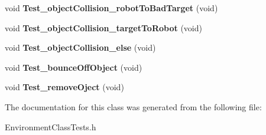 \begin{DoxyCompactItemize}
\item 
\hypertarget{classEnvironmentClassTests_a986fb21b334a78a100fe98aeaa6eaeb4}{void {\bfseries Test\-\_\-object\-Collision\-\_\-robot\-To\-Bad\-Target} (void)}\label{classEnvironmentClassTests_a986fb21b334a78a100fe98aeaa6eaeb4}

\item 
\hypertarget{classEnvironmentClassTests_af47f0dd4398b6af5f25c1c02e28fda6c}{void {\bfseries Test\-\_\-object\-Collision\-\_\-target\-To\-Robot} (void)}\label{classEnvironmentClassTests_af47f0dd4398b6af5f25c1c02e28fda6c}

\item 
\hypertarget{classEnvironmentClassTests_ac8dfea35e15f139486c22ab7ffa6a7af}{void {\bfseries Test\-\_\-object\-Collision\-\_\-else} (void)}\label{classEnvironmentClassTests_ac8dfea35e15f139486c22ab7ffa6a7af}

\item 
\hypertarget{classEnvironmentClassTests_a574a1b8e946f1135401dc9c33ed97c16}{void {\bfseries Test\-\_\-bounce\-Off\-Object} (void)}\label{classEnvironmentClassTests_a574a1b8e946f1135401dc9c33ed97c16}

\item 
\hypertarget{classEnvironmentClassTests_a61e452322ad1823ef327abe15d10d9b9}{void {\bfseries Test\-\_\-remove\-Oject} (void)}\label{classEnvironmentClassTests_a61e452322ad1823ef327abe15d10d9b9}

\end{DoxyCompactItemize}


The documentation for this class was generated from the following file\-:\begin{DoxyCompactItemize}
\item 
Environment\-Class\-Tests.\-h\end{DoxyCompactItemize}
